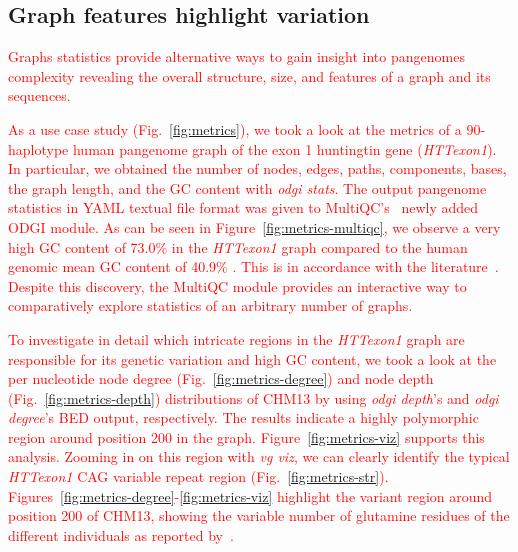 \documentclass{bioinfo}
\newcommand{\REVIEWED}[1]{{\textcolor{Red}{#1}}}
\begin{document}


\subsection{Graph features highlight variation}
\label{sec:metrics}

\REVIEWED{Graphs statistics provide alternative ways to gain insight into pangenomes complexity revealing the overall structure, size, and features of a graph and its sequences.}

\REVIEWED{As a use case study (Fig.~\ref{fig:metrics}), we took a look at the metrics of a 90-haplotype human pangenome graph of the exon 1 huntingtin gene (\textit{HTTexon1}). In particular, we obtained the number of nodes, edges, paths, components, bases, the graph length, and the GC content with \textit{odgi stats}. The output pangenome statistics in YAML textual file format was given to
MultiQC's~\citep{Ewels_2016} newly added ODGI module. As can be seen in Figure~\ref{fig:metrics-multiqc}, we observe a very high GC content of 73.0\% in the \textit{HTTexon1} graph compared to the human genomic mean GC content of 40.9\% \citep{Piovesan2019}. This is in accordance with the literature~\citep{Neueder2017}. %
Despite this discovery, the MultiQC module provides an interactive way to comparatively explore statistics of an arbitrary number of graphs.}

\REVIEWED{To investigate in detail which intricate regions in the \textit{HTTexon1} graph are responsible for its genetic variation and high GC content, we took a look at the per nucleotide node degree (Fig.~\ref{fig:metrics-degree}) and node depth (Fig.~\ref{fig:metrics-depth}) distributions of CHM13 by using \textit{odgi depth}'s and \textit{odgi degree}'s BED output, respectively.
The results indicate a highly polymorphic region around position 200 in the graph.
Figure~\ref{fig:metrics-viz} supports this analysis. Zooming in on this region with \textit{vg viz}, we can clearly identify the typical \textit{HTTexon1} CAG variable repeat region (Fig.~\ref{fig:metrics-str}).
Figures~\ref{fig:metrics-degree}-\ref{fig:metrics-viz} highlight the variant region around position 200 of CHM13, showing the variable number of glutamine residues of the different individuals as reported by~\citep{Nance1999}.}
\end{document}
